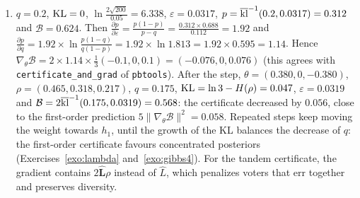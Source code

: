 \documentclass[11pt]{article}
\newcounter{exo}
\begin{document}
\begin{solution}
\begin{enumerate}
      questions~2--3,
      \[\nabla_\theta\mathcal B=2\Big[\frac{\partial p}{\partial q}\,\rho\odot\big(\widehat L-q\mathbf 1\big)+\frac{\partial p}{\partial\varepsilon}\,\frac1n\,\rho\odot\Big(\ln\frac\rho\pi-\KL(\rho\|\pi)\mathbf1\Big)\Big].\]
      At $\rho=\pi$ the second term vanishes and $\nabla_\theta\mathcal B=2\frac{\partial p}{\partial q}\,\pi\odot(\widehat L-q\mathbf 1)$: the logits of
      the voters better than average increase, the others decrease.
\item $q=0.2$, $\operatorname{KL}=0$, $\ln\frac{2\sqrt{200}}{0.05}=6.338$, $\varepsilon=0.0317$, $p=\overline{\operatorname{kl}}^{-1}(0.2,0.0317)=0.312$ and $\mathcal B=0.624$. Then
      $\frac{\partial p}{\partial\varepsilon}=\frac{p(1-p)}{p-q}=\frac{0.312\times0.688}{0.112}=1.92$ and
      $\frac{\partial p}{\partial q}=1.92\times\ln\frac{p(1-q)}{q(1-p)}=1.92\times\ln1.813=1.92\times0.595=1.14$. Hence
      $\nabla_\theta\mathcal B=2\times1.14\times\frac13(-0.1,0,0.1)=(-0.076,0,0.076)$ (this agrees with
      \texttt{certificate\_and\_grad} of \texttt{pbtools}). After the step, $\theta=(0.380,0,-0.380)$, $\rho=(0.465,0.318,0.217)$,
      $q=0.175$, $\operatorname{KL}=\ln3-H(\rho)=0.047$, $\varepsilon=0.0319$ and $\mathcal B=2\overline{\operatorname{kl}}^{-1}(0.175,0.0319)=0.568$: the certificate decreased by $0.056$,
      close to the first-order prediction $5\|\nabla_\theta\mathcal B\|^2=0.058$. Repeated steps keep moving the weight towards
      $h_1$, until the growth of the KL balances the decrease of $q$: the first-order certificate favours concentrated
      posteriors (Exercises~\ref{exo:lambda} and~\ref{exo:gibbs4}). For the tandem certificate, the gradient contains
      $2\widehat{\mathbf L}\rho$ instead of $\widehat L$, which penalizes voters that err together and preserves diversity.
\end{enumerate}
\end{solution}
\end{document}
